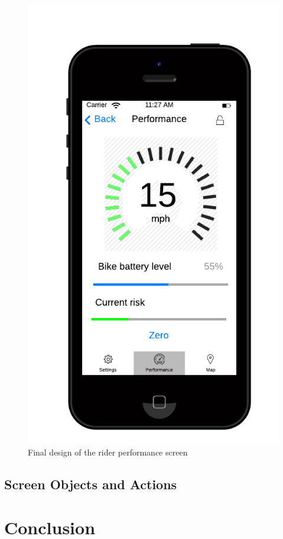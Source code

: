 \documentclass[a4paper]{report}
\begin{document}
\begin{figure}[h]
\centering
\includegraphics[scale=0.6]{figures/final_design/performance}
\caption{Final design of the rider performance screen}
\end{figure}
\section{Screen Objects and Actions}


\chapter{Conclusion}
\end{document}
